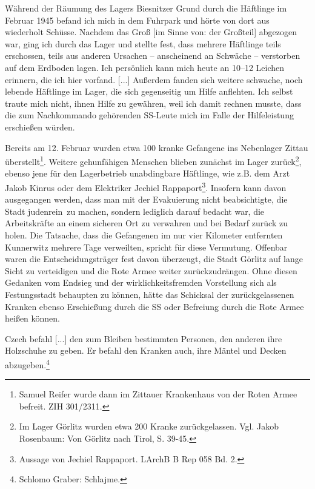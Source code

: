 \begin{leftbar} 
Während der Räumung des Lagers Biesnitzer Grund durch die Häftlinge im Februar 1945 befand ich mich in dem Fuhrpark und hörte von dort aus wiederholt Schüsse. Nachdem das Groß [im Sinne von: der Großteil] abgezogen war, ging ich durch das Lager und stellte fest, dass mehrere Häftlinge teils erschossen, teils aus anderen Ursachen -- anscheinend an Schwäche -- verstorben auf dem Erdboden lagen. Ich persönlich kann mich heute an 10--12 Leichen erinnern, die ich hier vorfand. [...] Außerdem fanden sich weitere schwache, noch lebende Häftlinge im Lager, die sich gegenseitig um Hilfe anflehten. Ich selbst traute mich nicht, ihnen Hilfe zu gewähren, weil ich damit rechnen musste, dass die zum Nachkommando gehörenden SS-Leute mich im Falle der Hilfeleistung erschießen würden.
\end{leftbar} 

Bereits am 12. Februar wurden etwa 100 kranke Gefangene ins Nebenlager Zittau überstellt\footnote{Samuel Reifer wurde dann im Zittauer Krankenhaus von der Roten Armee befreit. ZIH 301/2311.}. Weitere gehunfähigen Menschen blieben zunächst im Lager zurück\footnote{Im Lager Görlitz wurden etwa 200 Kranke zurückgelassen. Vgl. Jakob Rosenbaum: Von Görlitz nach Tirol, S. 39-45.}, ebenso jene für den Lagerbetrieb unabdingbare Häftlinge, wie z.B. dem Arzt Jakob Kinrus oder dem Elektriker Jechiel Rappaport\footnote{Aussage von Jechiel Rappaport. LArchB B Rep 058 Bd. 2.}. Insofern kann davon ausgegangen werden, dass man mit der Evakuierung nicht beabsichtigte, die Stadt \glqq judenrein\grqq~zu machen, sondern lediglich darauf bedacht war, die Arbeitskräfte an einem sicheren Ort zu verwahren und bei Bedarf zurück zu holen. Die Tatsache, dass die Gefangenen im nur vier Kilometer entfernten Kunnerwitz mehrere Tage verweilten, spricht für diese Vermutung. Offenbar waren die Entscheidungsträger fest davon überzeugt, die Stadt Görlitz auf lange Sicht zu verteidigen und die Rote Armee weiter zurückzudrängen. Ohne diesen Gedanken vom Endsieg und der wirklichkeitsfremden Vorstellung sich als Festungsstadt behaupten zu können, hätte das Schicksal der zurückgelassenen Kranken ebenso Erschießung durch die SS oder Befreiung durch die Rote Armee heißen können. 
\newline~
\begin{leftbar} 
 Czech befahl [...] den zum Bleiben bestimmten Personen, den anderen ihre Holzschuhe zu geben. Er befahl den Kranken auch, ihre Mäntel und Decken abzugeben.\footnote{Schlomo Graber: Schlajme.}
\end{leftbar}

